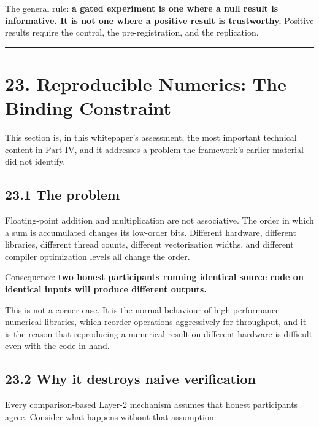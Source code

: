 \documentclass[
  11pt]{report}
\begin{document}
The general rule: \textbf{a gated experiment is one where a null result
is informative. It is not one where a positive result is trustworthy.}
Positive results require the control, the pre-registration, and the
replication.

\begin{center}\rule{0.5\linewidth}{0.5pt}\end{center}

\hypertarget{reproducible-numerics-the-binding-constraint}{%
\chapter{23. Reproducible Numerics: The Binding
Constraint}\label{reproducible-numerics-the-binding-constraint}}

This section is, in this whitepaper's assessment, the most important
technical content in Part IV, and it addresses a problem the framework's
earlier material did not identify.

\hypertarget{the-problem-2}{%
\section{23.1 The problem}\label{the-problem-2}}

Floating-point addition and multiplication are not associative. The
order in which a sum is accumulated changes its low-order bits.
Different hardware, different libraries, different thread counts,
different vectorization widths, and different compiler optimization
levels all change the order.

Consequence: \textbf{two honest participants running identical source
code on identical inputs will produce different outputs.}

This is not a corner case. It is the normal behaviour of
high-performance numerical libraries, which reorder operations
aggressively for throughput, and it is the reason that reproducing a
numerical result on different hardware is difficult even with the code
in hand.

\hypertarget{why-it-destroys-naive-verification}{%
\section{23.2 Why it destroys naive
verification}\label{why-it-destroys-naive-verification}}

Every comparison-based Layer-2 mechanism assumes that honest
participants agree. Consider what happens without that assumption:
\end{document}
